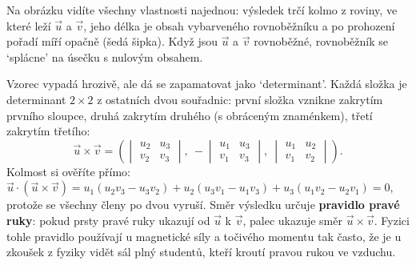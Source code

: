 \begin{center}
\end{center}
Na obrázku vidíte všechny vlastnosti najednou: výsledek trčí kolmo z roviny, ve které leží $\vec{u}$ a $\vec{v}$, jeho délka je obsah vybarveného rovnoběžníku a po prohození pořadí míří opačně (šedá šipka). Když jsou $\vec{u}$ a $\vec{v}$ rovnoběžné, rovnoběžník se `splácne' na úsečku s nulovým obsahem.

Vzorec vypadá hrozivě, ale dá se zapamatovat jako `determinant'. Každá složka je determinant $2\times 2$ z ostatních dvou souřadnic: první složka vznikne zakrytím prvního sloupce, druhá zakrytím druhého (s obráceným znaménkem), třetí zakrytím třetího:
\begin{equation*}
  \vec{u}\times\vec{v} = \left(\begin{vmatrix} u_2 & u_3\\ v_2 & v_3 \end{vmatrix},\ -\begin{vmatrix} u_1 & u_3\\ v_1 & v_3 \end{vmatrix},\ \begin{vmatrix} u_1 & u_2\\ v_1 & v_2 \end{vmatrix}\right).
\end{equation*}
Kolmost si ověříte přímo: $\vec{u}\cdot(\vec{u}\times\vec{v}) = u_1(u_2v_3 - u_3v_2) + u_2(u_3v_1 - u_1v_3) + u_3(u_1v_2 - u_2v_1) = 0$, protože se všechny členy po dvou vyruší. Směr výsledku určuje \textbf{pravidlo pravé ruky}: pokud prsty pravé ruky ukazují od $\vec{u}$ k $\vec{v}$, palec ukazuje směr $\vec{u}\times\vec{v}$. Fyzici tohle pravidlo používají u magnetické síly a točivého momentu tak často, že je u zkoušek z fyziky vidět sál plný studentů, kteří kroutí pravou rukou ve vzduchu.

